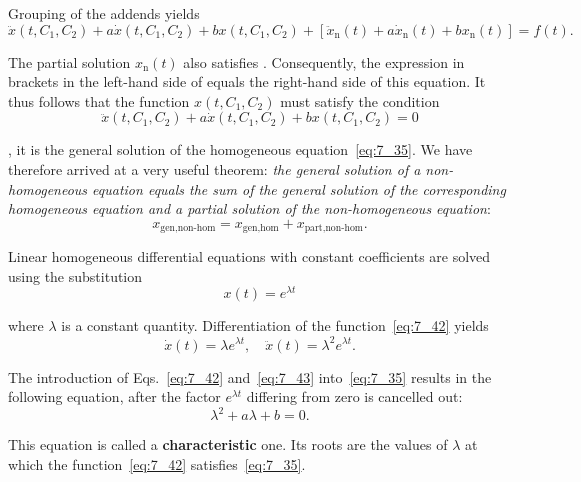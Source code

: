 \noindent
Grouping of the addends yields
\begin{equation}\label{eq:7_40}
	\ddot{x}(t, C_1, C_2) + a\dot{x}(t, C_1, C_2) + bx(t, C_1, C_2) + [\ddot{x}_{\text{n}}(t) + a\dot{x}_{\text{n}}(t) + bx_{\text{n}}(t)] = f(t).
\end{equation}

The partial solution $x_{\text{n}}(t)$ also satisfies . Consequently, the expression in brackets in the left-hand side of  equals the right-hand side of this equation. It thus follows that the function $x(t, C_1, C_2)$ must satisfy the condition
\begin{equation*}
	\ddot{x}(t, C_1, C_2) + a\dot{x}(t, C_1, C_2) + bx(t, C_1, C_2) = 0
\end{equation*}

\noindent
\ie, it is the general solution of the homogeneous equation~\eqref{eq:7_35}. We have therefore arrived at a very useful theorem: \textit{the general solution of a non-homogeneous equation equals the sum of the general solution of the corresponding homogeneous equation and a partial solution of the non-homogeneous equation}:
\begin{equation}\label{eq:7_41}
	x_{\text{gen,non-hom}} = x_{\text{gen,hom}} + x_{\text{part,non-hom}}.
\end{equation}

\noindent
Linear homogeneous differential equations with constant coefficients are solved using the substitution
\begin{equation}\label{eq:7_42}
	x(t) = e^{\lambda t}
\end{equation}

\noindent
where $\lambda$ is a constant quantity. Differentiation of the function~\eqref{eq:7_42} yields
\begin{equation}\label{eq:7_43}
	\dot{x}(t) = \lambda e^{\lambda t},\quad \ddot{x}(t) = \lambda^2 e^{\lambda t}.
\end{equation}

\noindent
The introduction of Eqs.~\eqref{eq:7_42} and~\eqref{eq:7_43} into~\eqref{eq:7_35} results in the following equation, after the factor $e^{\lambda t}$ differing from zero is cancelled out:
\begin{equation}\label{eq:7_44}
	\lambda^2 + a\lambda + b = 0.
\end{equation}

\noindent
This equation is called a \textbf{characteristic} one. Its roots are the values of $\lambda$ at which the function~\eqref{eq:7_42} satisfies~\eqref{eq:7_35}.

